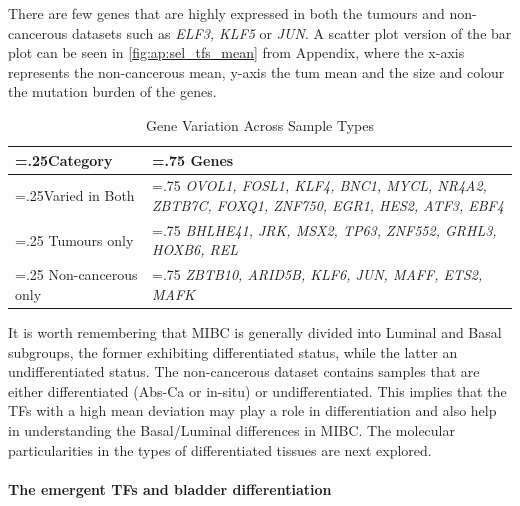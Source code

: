 There are few genes that are highly expressed in both the tumours and non-cancerous datasets such as \textit{ELF3, KLF5} or \textit{JUN}. A scatter plot version of the bar plot can be seen in \cref{fig:ap:sel_tfs_mean} from Appendix, where the x-axis represents the non-cancerous mean, y-axis the tum mean and the size and colour the mutation burden of the genes.

\begin{table}[H]
  \centering
  \begin{tabularx}{\textwidth}{>{\hsize=.25\hsize}X|>{\hsize=.75\hsize}X}
    \toprule
    \textbf{Category} & \textbf{Genes} \\
    \midrule
    Varied in Both & \textit{OVOL1, FOSL1, KLF4, BNC1, MYCL, NR4A2, ZBTB7C, FOXQ1, ZNF750, EGR1, HES2, ATF3, EBF4} \\
    \midrule
    Tumours only & \textit{BHLHE41, JRK, MSX2, TP63, ZNF552, GRHL3, HOXB6, REL} \\
    \midrule
    Non-cancerous only & \textit{ZBTB10, ARID5B, KLF6, JUN, MAFF, ETS2, MAFK} \\
    \bottomrule
  \end{tabularx}
    \caption{Gene Variation Across Sample Types} %
    \label{tab:N_I:sel_tfs_var}
\end{table}


It is worth remembering that MIBC is generally divided into Luminal and Basal subgroups, the former exhibiting differentiated status, while the latter an undifferentiated status. The non-cancerous dataset contains samples that are either differentiated (Abs-Ca or in-situ) or undifferentiated. This implies that the TFs with a high mean deviation may play a role in differentiation and also help in understanding the Basal/Luminal differences in MIBC. The molecular particularities in the types of differentiated tissues are next explored.

\paragraph*{The emergent TFs and bladder differentiation} \label{s:N:sel_tf_diff_status}

